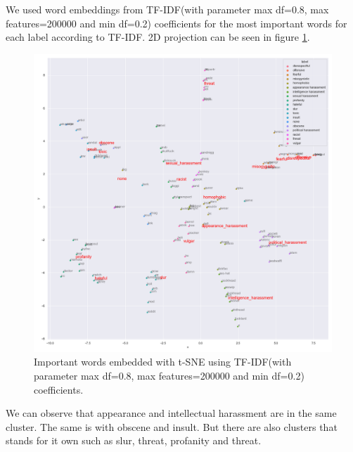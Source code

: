 \documentclass[fleqn,moreauthors,10pt]{ds_report}
\begin{document}
We used word embeddings from TF-IDF(with parameter max df=0.8, max features=200000 and min df=0.2) coefficients for the most important words for each label according to TF-IDF. 2D projection can be seen in figure \ref{fig:tfidf_embedding}.
\begin{figure}
    \centering
    \includegraphics[width=\columnwidth]{fig/TSNE-tfidf.png}%
    \caption{Important words embedded with t-SNE using TF-IDF(with parameter max df=0.8, max features=200000 and min df=0.2) coefficients.}
    \label{fig:tfidf_embedding}
\end{figure}
We can observe that appearance and intellectual harassment are in the same cluster. The same is with obscene and insult. But there are also clusters that stands for it own such as slur, threat, profanity and threat.
\end{document}
